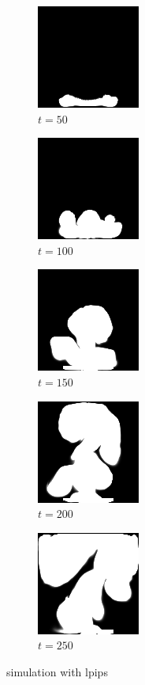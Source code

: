 \documentclass[a4paper,12pt,twoside]{report}
\begin{document}
\begin{figure}
\centering
\begin{subfigure}{0.18\textwidth}
  \centering
  \includegraphics[scale=0.56]{buoyancy_test/dens_000050_lpips.png}
  \caption{$t=50$}
\end{subfigure}
\begin{subfigure}{0.18\textwidth}
  \centering
  \includegraphics[scale=0.56]{buoyancy_test/dens_000100_lpips.png}
  \caption{$t=100$}
\end{subfigure}
\begin{subfigure}{0.18\textwidth}
  \centering
  \includegraphics[scale=0.56]{buoyancy_test/dens_000150_lpips.png}
  \caption{$t=150$}
\end{subfigure}
\begin{subfigure}{0.18\textwidth}
  \centering
  \includegraphics[scale=0.56]{buoyancy_test/dens_000200_lpips.png}
  \caption{$t=200$}
\end{subfigure}
\begin{subfigure}{0.18\textwidth}
  \centering
  \includegraphics[scale=0.56]{buoyancy_test/dens_000249_lpips.png}
  \caption{$t=250$}
\end{subfigure}
\caption{simulation with lpips}
\end{figure}
\end{document}
